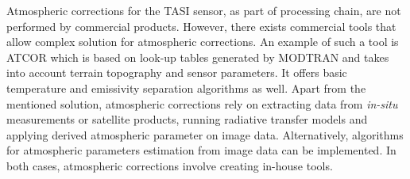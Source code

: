 Atmospheric corrections for the TASI sensor, as part of processing chain, are not performed by commercial products. However, there exists commercial tools that allow complex solution for atmospheric corrections. An example of such a tool is ATCOR \cite{RS02} which is based on look-up tables generated by MODTRAN and takes into account terrain topography and sensor parameters. It offers basic temperature and emissivity separation algorithms as well. Apart from the mentioned solution, atmospheric corrections rely on extracting data from \textit{in-situ} measurements or satellite products, running radiative transfer models and applying derived atmospheric parameter on image data. Alternatively, algorithms for atmospheric parameters estimation from image data can be implemented. In both cases, atmospheric corrections involve creating in-house tools.


